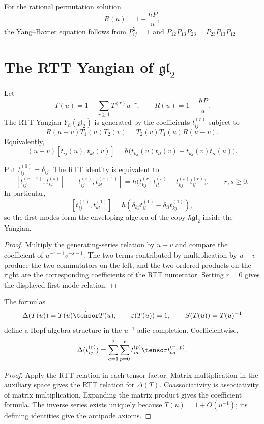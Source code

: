 For the rational permutation solution
\[
 R(u)=1-\frac{\hbar P}{u},
\]
the Yang--Baxter equation follows from $P_{ij}^2=1$ and
$P_{12}P_{13}P_{23}=P_{23}P_{13}P_{12}$.

\chapter{The RTT Yangian of \texorpdfstring{$\mathfrak{gl}_2$}{gl2}}
Let
\[
 T(u)=1+\sum_{r\ge1}T^{(r)}u^{-r},
 \qquad R(u)=1-\frac{\hbar P}{u}.
\]
The RTT Yangian $Y_\hbar(\mathfrak{gl}_2)$ is generated by the coefficients $t_{ij}^{(r)}$ subject to
\[
 R(u-v)T_1(u)T_2(v)=T_2(v)T_1(u)R(u-v).
\]
Equivalently,
\[
 (u-v)[t_{ij}(u),t_{kl}(v)]
 =\hbar\bigl(t_{kj}(u)t_{il}(v)-t_{kj}(v)t_{il}(u)\bigr).
\]

\begin{proposition}
Put $t_{ij}^{(0)}=\delta_{ij}$. The RTT identity is equivalent to
\[
 [t_{ij}^{(r+1)},t_{kl}^{(s)}]-[t_{ij}^{(r)},t_{kl}^{(s+1)}]
 =\hbar\bigl(t_{kj}^{(r)}t_{il}^{(s)}-t_{kj}^{(s)}t_{il}^{(r)}\bigr),
 \qquad r,s\ge0.
\]
In particular,
\[
 [t_{ij}^{(1)},t_{kl}^{(1)}]
 =\hbar(\delta_{kj}t_{il}^{(1)}-\delta_{il}t_{kj}^{(1)}),
\]
so the first modes form the enveloping algebra of the copy $\hbar\mathfrak{gl}_2$ inside the Yangian.
\end{proposition}
\begin{proof}
Multiply the generating-series relation by $u-v$ and compare the coefficient of $u^{-r-1}v^{-s-1}$. The two terms contributed by multiplication by $u-v$ produce the two commutators on the left, and the two ordered products on the right are the corresponding coefficients of the RTT numerator. Setting $r=0$ gives the displayed first-mode relation.
\end{proof}

\begin{theorem}
The formulas
\[
 \Delta(T(u))=T(u)\dot\tensor T(u),\qquad
 \varepsilon(T(u))=1,\qquad
 S(T(u))=T(u)^{-1}
\]
define a Hopf algebra structure in the $u^{-1}$-adic completion. Coefficientwise,
\[
 \Delta(t_{ij}^{(r)})
 =\sum_{a=1}^{2}\sum_{p=0}^{r}
 t_{ia}^{(p)}\tensor t_{aj}^{(r-p)}.
\]
\end{theorem}
\begin{proof}
Apply the RTT relation in each tensor factor. Matrix multiplication in the auxiliary space gives the RTT relation for $\Delta(T)$. Coassociativity is associativity of matrix multiplication. Expanding the matrix product gives the coefficient formula. The inverse series exists uniquely because $T(u)=1+O(u^{-1})$; its defining identities give the antipode axioms.
\end{proof}

